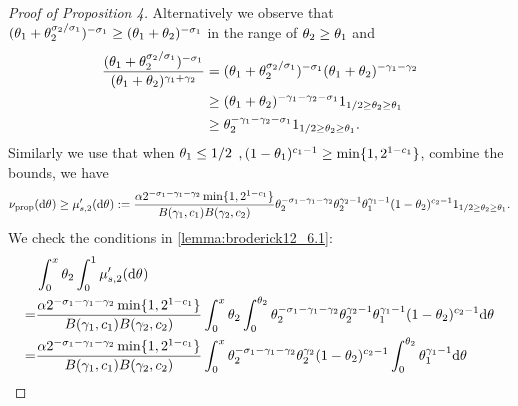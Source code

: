 \begin{proof}[Proof of Proposition 4]
Alternatively we observe that $(\theta_{1}+\theta_{2}^{\sigma_{2}/\sigma_{1}})^{-\sigma_{1}}\ge (\theta_{1}+\theta_{2})^{-\sigma_{1}}$ in the range of $\theta_{2}\ge \theta_{1}$ and 
\begin{align*}
    \frac{(\variantfreqperpop{1}+\variantfreqperpop{2}^{\rate{2}/\rate{1}})^{-\rate{1}}}{(\variantfreqperpop{1}+\variantfreqperpop{2})^{\corr{1}+\corr{2}}}&=(\variantfreqperpop{1}+\variantfreqperpop{2}^{\rate{2}/\rate{1}})^{-\rate{1}}(\variantfreqperpop{1}+\variantfreqperpop{2})^{-\corr{1}-\corr{2}}\\
    &\ge (\variantfreqperpop{1}+\variantfreqperpop{2})^{-\corr{1}-\corr{2}-\rate{1}}\bm{1}_{1/2 \ge \variantfreqperpop{2} \ge \variantfreqperpop{1}}\\
    &\ge \variantfreqperpop{2}^{-\corr{1}-\corr{2}-\rate{1}}\bm{1}_{1/2 \ge \variantfreqperpop{2} \ge \variantfreqperpop{1}}.
\end{align*}
Similarly we use that when $\theta_{1}\le 1/2$ $,(1-\theta_{1})^{c_{1}-1}\ge \min\{1, 2^{1-c_{1}}\}$, combine the bounds, we have 
\begin{align*}
    \ratemeasproposed(\de\vecvariantfreq{})\ge\mu'_{s,2}(\de\vecvariantfreq{}):= \frac{\mass 2^{-\rate{1}-\corr{1}-\corr{2}}\min\{1, 2^{1-\conc{1}}\}}{B(\corr{1}, \conc{1})B(\corr{2}, \conc{2})}\variantfreqperpop{2}^{-\rate{1}-\corr{1}-\corr{2}} \variantfreqperpop{2}^{\corr{2}-1}\variantfreqperpop{1}^{\corr{1}-1}(1-\variantfreqperpop{2})^{\conc{2}-1} \bm{1}_{1/2 \ge \variantfreqperpop{2} \ge \variantfreqperpop{1}}.
\end{align*}
We check the conditions in \cref{lemma:broderick12_6.1}:
\begin{align*}
    &\int_0^x \variantfreqperpop{2} \int_0^1 \mu'_{s,2}(\de\vecvariantfreq{})\\
    =& \frac{\mass 2^{-\rate{1}-\corr{1}-\corr{2}}\min\{1, 2^{1-\conc{1}}\}}{B(\corr{1}, \conc{1})B(\corr{2}, \conc{2})}\int_0^x \variantfreqperpop{2} \int_0^{\variantfreqperpop{2}} \variantfreqperpop{2}^{-\rate{1}-\corr{1}-\corr{2}} \variantfreqperpop{2}^{\corr{2}-1}\variantfreqperpop{1}^{\corr{1}-1}(1-\variantfreqperpop{2})^{\conc{2}-1}\de\vecvariantfreq{}\\
    =& \frac{\mass 2^{-\rate{1}-\corr{1}-\corr{2}}\min\{1, 2^{1-\conc{1}}\}}{B(\corr{1}, \conc{1})B(\corr{2}, \conc{2})}\int_0^x \variantfreqperpop{2}^{-\rate{1}-\corr{1}-\corr{2}} \variantfreqperpop{2}^{\corr{2}} (1-\variantfreqperpop{2})^{\conc{2}-1} \int_0^{\variantfreqperpop{2}} \variantfreqperpop{1}^{\corr{1}-1}\de\vecvariantfreq{}\\

\end{align*}
\end{proof}
